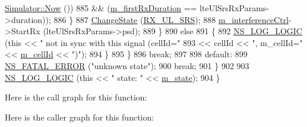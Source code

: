 \begin{DoxyCode}
      \hyperlink{classns3_1_1Simulator_ac3178fa975b419f7875e7105be122800}{Simulator::Now} ()) 
885                            && (\hyperlink{classns3_1_1LteSpectrumPhy_a9dbb2b47df4bfc5d78bff2ed21a4cad8}{m\_firstRxDuration} == lteUlSrsRxParams->duration));
886               \}            
887             \hyperlink{classns3_1_1LteSpectrumPhy_a64a105b7c580b3d6dc5cd4b97d1223d9}{ChangeState} (\hyperlink{classns3_1_1LteSpectrumPhy_a52ce2cf9b4846807449c50399f6b8000aafc3f752bdb8472fa1a379757ce8a09f}{RX\_UL\_SRS});
888             \hyperlink{classns3_1_1LteSpectrumPhy_ad578c25e0d4dd05b888c4dd83ec52e13}{m\_interferenceCtrl}->StartRx (lteUlSrsRxParams->psd);          
889           \}
890         \textcolor{keywordflow}{else}
891           \{
892             \hyperlink{group__logging_ga88acd260151caf2db9c0fc84997f45ce}{NS\_LOG\_LOGIC} (\textcolor{keyword}{this} << \textcolor{stringliteral}{" not in sync with this signal (cellId="} 
893                           << cellId  << \textcolor{stringliteral}{", m\_cellId="} << \hyperlink{classns3_1_1LteSpectrumPhy_a996732fedbe320aedd9d2def1fc6e3c7}{m\_cellId} << \textcolor{stringliteral}{")"});          
894           \}
895       \}
896       \textcolor{keywordflow}{break};
897       
898     \textcolor{keywordflow}{default}:
899       \hyperlink{group__fatal_ga5131d5e3f75d7d4cbfd706ac456fdc85}{NS\_FATAL\_ERROR} (\textcolor{stringliteral}{"unknown state"});
900       \textcolor{keywordflow}{break};
901     \}
902   
903   \hyperlink{group__logging_ga88acd260151caf2db9c0fc84997f45ce}{NS\_LOG\_LOGIC} (\textcolor{keyword}{this} << \textcolor{stringliteral}{" state: "} << \hyperlink{classns3_1_1LteSpectrumPhy_a985b6688f1bbfcd8703096040b5c9b10}{m\_state});
904 \}
\end{DoxyCode}


Here is the call graph for this function\+:




Here is the caller graph for this function\+:


